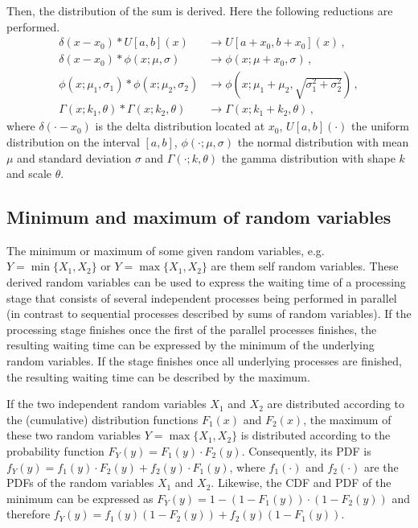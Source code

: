 Then, the distribution of the sum is derived. Here the following reductions are performed.
\begin{align}
 \delta(x-x_0)\ast U[a,b](x) &\longrightarrow U[a+x_0,b+x_0](x)\,, \nonumber \\
 \delta(x-x_0)\ast \phi(x; \mu, \sigma) &\longrightarrow \phi(x; \mu+x_0, \sigma)\,, \nonumber \\
 \phi(x; \mu_1, \sigma_1)\ast \phi(x; \mu_2, \sigma_2) &\longrightarrow 
   \phi(x; \mu_1+\mu_2, \sqrt{\sigma_1^2+\sigma_2^2}) \nonumber\,, \\
 \Gamma(x; k_1, \theta)\ast \Gamma(x; k_2, \theta) &\longrightarrow 
   \Gamma(x; k_1+k_2, \theta)\,, \nonumber
\end{align}
where $\delta(\cdot-x_0)$ is the delta distribution located at $x_0$, $U[a,b](\cdot)$ the uniform
distribution on the interval $[a,b]$, $\phi(\cdot; \mu, \sigma)$ the normal distribution with mean 
$\mu$ and standard deviation $\sigma$ and $\Gamma(\cdot; k, \theta)$ the gamma distribution with
shape $k$ and scale $\theta$.

\subsection{Minimum and maximum of random variables}
The minimum or maximum of some given random variables, e.g. $Y=\min\{X_1,X_2\}$ or 
$Y=\max\{X_1,X_2\}$ are them self random variables. These derived random variables can be used to
express the waiting time of a processing stage that consists of several independent processes being
performed in parallel (in contrast to sequential processes described by sums of random variables). 
If the processing stage finishes once the first of the parallel processes finishes, the 
resulting waiting time can be expressed by the minimum of the underlying random variables. If the stage
finishes once all underlying processes are finished, the resulting waiting time can be described
by the maximum.	 

If the two independent random variables $X_1$ and $X_2$ are distributed according to the (cumulative) distribution
functions $F_1(x)$ and $F_2(x)$, the maximum of these two random variables $Y=\max\{X_1,X_2\}$
is distributed according to the probability function $F_Y(y)=F_1(y)\cdot F_2(y)$. Consequently, its PDF
is $f_Y(y)=f_1(y)\cdot F_2(y) + f_2(y)\cdot F_1(y)$, where $f_1(\cdot)$ and $f_2(\cdot)$ are the PDFs
of the random variables $X_1$ and $X_2$. Likewise, the CDF and PDF of the minimum can be expressed as
$F_Y(y)=1-(1-F_1(y))\cdot(1-F_2(y))$ and therefore $f_Y(y) = f_1(y)(1-F_2(y)) + f_2(y)(1-F_1(y))$.

